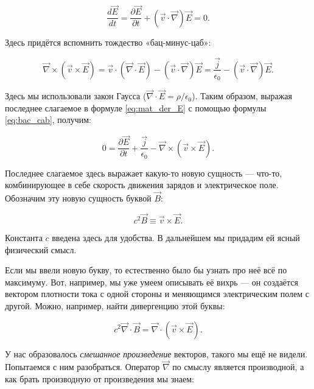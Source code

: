 \documentclass[a4paper,12pt]{article}
\numberwithin{equation}{section}
\newcommand{\pt}{\partial}
\newcommand{\eps}{\epsilon}
\newcommand{\vn}{\vec{\nabla}}
\begin{document}
\begin{equation}
  \label{eq:mat_der_E}
  \frac{d\vec{E}}{dt} = \frac{\pt \vec{E}}{\pt t} + (\vec{v}\cdot \vn)
  \vec{E} = 0.
\end{equation}

Здесь придётся вспомнить тождество «бац-минус-цаб»: 

\begin{equation}
  \label{eq:bac_cab}
  \vn \times \left( \vec{v} \times \vec{E} \right) = \vec{v} \cdot (\vn
  \cdot \vec{E}) - (\vec{v}\cdot \vn) \vec{E} = \frac{\vec{j}}{\eps_0}  -
  (\vec{v}\cdot \vn) \vec{E}.
\end{equation}

Здесь мы использовали закон Гаусса ($\vn \cdot \vec{E} = \rho/\eps_0$). Таким образом, выражая последнее слагаемое в формуле
\eqref{eq:mat_der_E} с помощью формулы \eqref{eq:bac_cab}, получим: 

\begin{equation}
  \label{eq:maxwell_eq_4_1}
  0 = \frac{\pt \vec{E}}{\pt t} + \frac{\vec{j}}{\eps_0} - \vn \times \left(
    \vec{v} \times \vec{E} \right).
\end{equation}

Последнее слагаемое здесь выражает какую-то новую сущность — что-то,
комбинирующее в себе скорость движения зарядов и электрическое
поле. Обозначим эту новую сущность буквой $\vec{B}$: 

\begin{equation}
  \label{eq:def_magnetic}
  c^2\vec{B} \equiv \vec{v} \times \vec{E}. 
\end{equation}

Константа $c$ введена здесь для удобства. В дальнейшем мы придадим ей
ясный физический смысл.

Если мы ввели новую букву, то естественно было бы узнать про неё всё
по максимуму. Вот, например, мы уже умеем описывать её вихрь — он
создаётся вектором плотности тока с одной стороны и меняющимся
электрическим полем с другой. Можно, например, найти дивергенцию этой
буквы:

\begin{equation}
  \label{eq:div_B_1}
  c^2\vn \cdot \vec{B} =  \vn \cdot \left( \vec{v} \times \vec{E} \right).
\end{equation}

У нас образовалось \textit{смешанное произведение} векторов, такого мы
ещё не видели. Попытаемся с ним разобраться. Оператор $\vn$ по смыслу
является производной, а как брать производную от произведения мы
знаем: 
\end{document}
